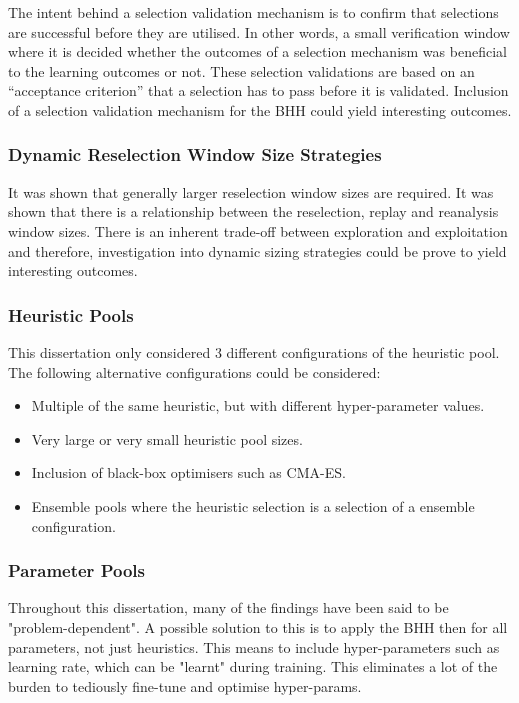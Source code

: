 The intent behind a selection validation mechanism is to confirm that selections are successful before they are utilised. In other words, a small verification window where it is decided whether the outcomes of a selection mechanism was beneficial to the learning outcomes or not. These selection validations are based on an ``acceptance criterion'' that a selection has to pass before it is validated. Inclusion of a selection validation mechanism for the \ac{BHH} could yield interesting outcomes.

\subsubsection{Dynamic Reselection Window Size Strategies}

It was shown that generally larger reselection window sizes are required. It was shown that there is a relationship between the reselection, replay and reanalysis window sizes. There is an inherent trade-off between exploration and exploitation and therefore, investigation into dynamic sizing strategies could be prove to yield interesting outcomes.

\subsubsection{Heuristic Pools}

This dissertation only considered 3 different configurations of the heuristic pool. The following alternative  configurations could be considered:

\begin{itemize}
      \item Multiple of the same heuristic, but with different hyper-parameter values.
      \item Very large or very small heuristic pool sizes.
      \item Inclusion of black-box optimisers such as CMA-ES.
      \item Ensemble pools where the heuristic selection is a selection of a ensemble configuration.
\end{itemize}

\subsubsection{Parameter Pools}

Throughout this dissertation, many of the findings have been said to be "problem-dependent". A possible solution to this is to apply the \ac{BHH} then for all parameters, not just heuristics. This means to include hyper-parameters such as learning rate, which can be "learnt" during training. This eliminates a lot of the burden to tediously fine-tune and optimise hyper-params.

